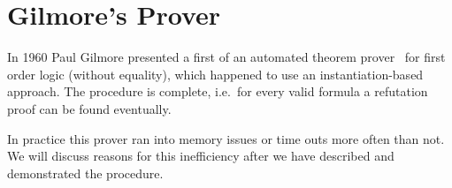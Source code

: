 
\section{Gilmore's Prover}\label{sec:gilmore:prover}

In 1960 Paul Gilmore presented a first  of an automated
theorem prover~\cite{5392528} for first order logic (without equality),
which happened to use an instantiation-based approach.
The procedure is complete, i.e.~for every valid formula
a refutation proof can be found eventually.

In practice this prover ran into memory issues or time outs more often than not.
We will discuss reasons for this inefficiency after we have described and demonstrated the procedure.



